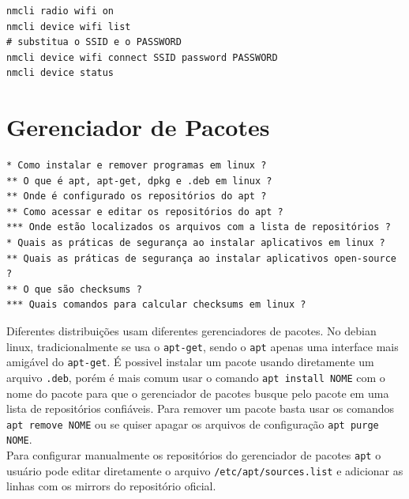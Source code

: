 \documentclass[12pt,a4paper]{article}
\begin{document}
\begin{lstlisting}
nmcli radio wifi on 
nmcli device wifi list 
# substitua o SSID e o PASSWORD
nmcli device wifi connect SSID password PASSWORD 
nmcli device status 
\end{lstlisting}

\section{Gerenciador de Pacotes}

\begin{lstlisting}
* Como instalar e remover programas em linux ? 
** O que é apt, apt-get, dpkg e .deb em linux ?  
** Onde é configurado os repositórios do apt ? 
** Como acessar e editar os repositórios do apt ? 
*** Onde estão localizados os arquivos com a lista de repositórios ? 
* Quais as práticas de segurança ao instalar aplicativos em linux ?
** Quais as práticas de segurança ao instalar aplicativos open-source ?
** O que são checksums ?
*** Quais comandos para calcular checksums em linux ? 
\end{lstlisting}

\vspace{\baselineskip}

Diferentes distribuições usam diferentes gerenciadores de pacotes. No debian linux, tradicionalmente se usa o \texttt{apt-get}, sendo o \texttt{apt} apenas uma interface mais amigável do \texttt{apt-get}. É possivel instalar um pacote usando diretamente um arquivo \texttt{.deb}, porém é mais comum usar o comando \texttt{apt install NOME} com o nome do pacote para que o gerenciador de pacotes busque pelo pacote em uma lista de repositórios confiáveis. Para remover um pacote basta usar os comandos \texttt{apt remove NOME} ou se quiser apagar os arquivos de configuração \texttt{apt purge NOME}. \\


Para configurar manualmente os repositórios do gerenciador de pacotes \texttt{apt} o usuário pode editar diretamente o arquivo \texttt{/etc/apt/sources.list} e adicionar as linhas com os mirrors do repositório oficial.\\
\end{document}
